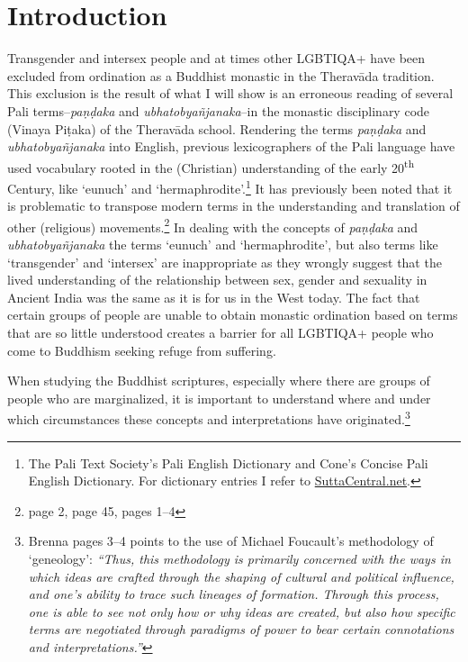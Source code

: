 \section{Introduction}
Transgender and intersex people and at times other LGBTIQA+ have been excluded from ordination as a Buddhist monastic in the Theravāda tradition. This exclusion is the result of what I will show is an erroneous reading of several Pali terms--{\em paṇḍaka} and {\em ubhatob­yañ­janaka}--in the monastic disciplinary code (Vinaya Piṭaka) of the Theravāda school. Rendering the terms {\em paṇḍaka} and {\em ubhatob­yañ­janaka} into English, previous lexicographers of the Pali language have used vocabulary rooted in the (Christian) understanding of the early 20\textsuperscript{th} Century, like `eunuch' and `hermaphrodite'.\footnote{The Pali Text Society's Pali English Dictionary and Cone's Concise Pali English Dictionary. For dictionary entries I refer to \href{https://suttacentral.net/}{SuttaCentral.net}.} It has previously been noted that it is problematic to transpose modern terms in the understanding and translation of other (religious) movements.\footnote{\cite{maes} page 2, \cite{dudas} page 45, \cite{artinger} pages 1–4} In dealing with the concepts of {\em paṇḍaka} and {\em ubhatob­yañ­janaka} the terms `eunuch' and `hermaphrodite', but also terms like `transgender' and `intersex' are inappropriate as they wrongly suggest that the lived understanding of the relationship between sex, gender and sexuality in Ancient India was the same as it is for us in the West today. The fact that certain groups of people are unable to obtain monastic ordination based on terms that are so little understood creates a barrier for all LGBTIQA+ people who come to Buddhism seeking refuge from suffering.

When studying the Buddhist scriptures, especially where there are groups of people who are marginalized, it is important to understand where and under which circumstances these concepts and interpretations have originated.\footnote{Brenna \cite{artinger} pages 3–4 points to the use of Michael Foucault's methodology of `geneology': {\em ``Thus, this methodology is primarily concerned with the ways in which ideas are crafted through the shaping of cultural and political influence, and one's ability to trace such lineages of formation. Through this process, one is able to see not only how or why ideas are created, but also how specific terms are negotiated through paradigms of power to bear certain connotations and interpretations.''}}

